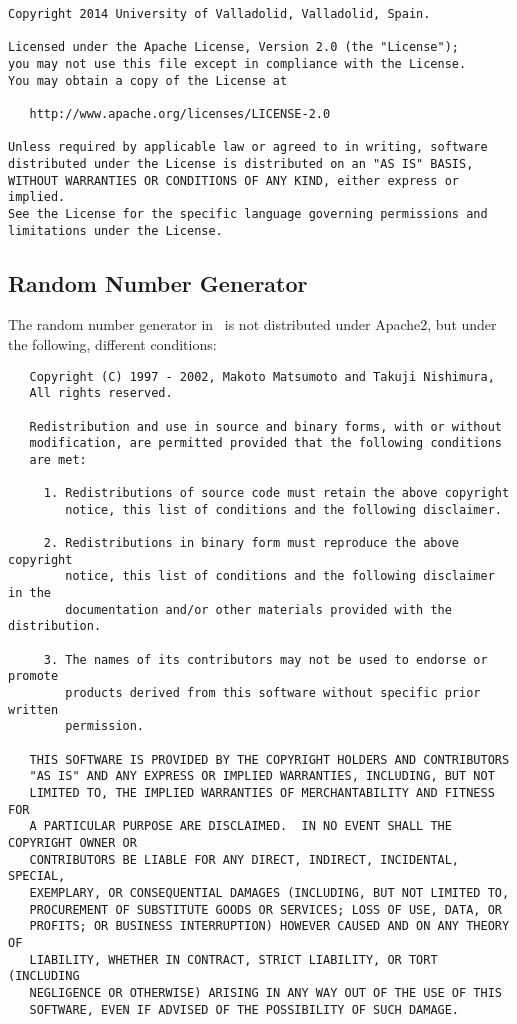 \begin{verbatim}
Copyright 2014 University of Valladolid, Valladolid, Spain.

Licensed under the Apache License, Version 2.0 (the "License");
you may not use this file except in compliance with the License.
You may obtain a copy of the License at

   http://www.apache.org/licenses/LICENSE-2.0

Unless required by applicable law or agreed to in writing, software
distributed under the License is distributed on an "AS IS" BASIS,
WITHOUT WARRANTIES OR CONDITIONS OF ANY KIND, either express or implied.
See the License for the specific language governing permissions and
limitations under the License.
\end{verbatim}

\subsection{Random Number Generator}
The random number generator in \MMonCa\ is not distributed under Apache2, but under the following, different conditions:

\begin{verbatim}
   Copyright (C) 1997 - 2002, Makoto Matsumoto and Takuji Nishimura,
   All rights reserved.                          

   Redistribution and use in source and binary forms, with or without
   modification, are permitted provided that the following conditions
   are met:

     1. Redistributions of source code must retain the above copyright
        notice, this list of conditions and the following disclaimer.

     2. Redistributions in binary form must reproduce the above copyright
        notice, this list of conditions and the following disclaimer in the
        documentation and/or other materials provided with the distribution.

     3. The names of its contributors may not be used to endorse or promote 
        products derived from this software without specific prior written 
        permission.

   THIS SOFTWARE IS PROVIDED BY THE COPYRIGHT HOLDERS AND CONTRIBUTORS
   "AS IS" AND ANY EXPRESS OR IMPLIED WARRANTIES, INCLUDING, BUT NOT
   LIMITED TO, THE IMPLIED WARRANTIES OF MERCHANTABILITY AND FITNESS FOR
   A PARTICULAR PURPOSE ARE DISCLAIMED.  IN NO EVENT SHALL THE COPYRIGHT OWNER OR
   CONTRIBUTORS BE LIABLE FOR ANY DIRECT, INDIRECT, INCIDENTAL, SPECIAL,
   EXEMPLARY, OR CONSEQUENTIAL DAMAGES (INCLUDING, BUT NOT LIMITED TO,
   PROCUREMENT OF SUBSTITUTE GOODS OR SERVICES; LOSS OF USE, DATA, OR
   PROFITS; OR BUSINESS INTERRUPTION) HOWEVER CAUSED AND ON ANY THEORY OF
   LIABILITY, WHETHER IN CONTRACT, STRICT LIABILITY, OR TORT (INCLUDING
   NEGLIGENCE OR OTHERWISE) ARISING IN ANY WAY OUT OF THE USE OF THIS
   SOFTWARE, EVEN IF ADVISED OF THE POSSIBILITY OF SUCH DAMAGE.
\end{verbatim}
